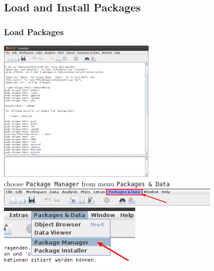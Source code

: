 \documentclass[xcolor={table}]{beamer}
\begin{document}
\subsection{Load and Install Packages}
\begin{frame}[allowframebreaks]\frametitle{Load Packages}
\begin{center}
\includegraphics[height=7cm]{whole.png}\\
choose \texttt{Package Manager} from menu \texttt{Packages \& Data}
  \includegraphics[width=11cm]{menupack1.png}\\
\vspace*{0.5cm}
  \includegraphics[width=7cm]{menupack2.png}
\end{center}
\end{frame}
\end{document}
